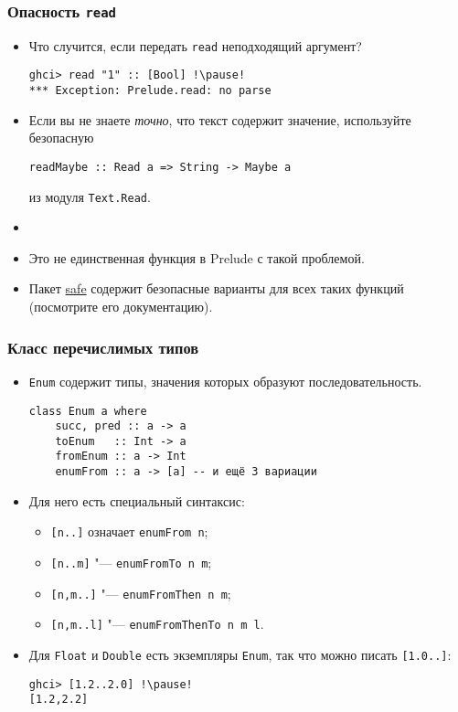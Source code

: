 \documentclass[10pt]{beamer}
\begin{document}
\begin{frame}[fragile]
\frametitle{Опасность \lstinline|read|}
\begin{itemize}
    \item Что случится, если передать \lstinline|read| неподходящий аргумент?
\begin{lstlisting}
ghci> read "1" :: [Bool] !\pause!
*** Exception: Prelude.read: no parse
\end{lstlisting}
    \item Если вы не знаете \emph{точно}, что текст содержит значение, используйте безопасную
\begin{lstlisting}
readMaybe :: Read a => String -> Maybe a
\end{lstlisting}
    из модуля \lstinline|Text.Read|.
    \pause
    \item[]
    \item Это не единственная функция в Prelude с такой проблемой.
    \item Пакет \href{https://hackage.haskell.org/package/safe}{safe} содержит безопасные варианты для всех таких функций (посмотрите его документацию).
    \end{itemize}
\end{frame}

\begin{frame}[fragile]
\frametitle{Класс перечислимых типов}
\begin{itemize}
    \item 
    \lstinline|Enum| содержит типы, значения которых образуют последовательность.
\begin{lstlisting}
class Enum a where
    succ, pred :: a -> a
    toEnum   :: Int -> a
    fromEnum :: a -> Int
    enumFrom :: a -> [a] -- и ещё 3 вариации
\end{lstlisting}
    \pause
    \item Для него есть специальный синтаксис: 
    \begin{itemize}
        \item \lstinline|[n..]| означает \lstinline|enumFrom n|;
        \item \lstinline|[n..m]| "--- \lstinline|enumFromTo n m|;
        \item \lstinline|[n,m..]| "--- \lstinline|enumFromThen n m|;
        \item \lstinline|[n,m..l]| "--- \lstinline|enumFromThenTo n m l|.
    \end{itemize}
    \pause
    \item Для \lstinline|Float| и \lstinline|Double| есть экземпляры \lstinline|Enum|, так что можно писать \lstinline|[1.0..]|: 
\begin{lstlisting}
ghci> [1.2..2.0] !\pause!
[1.2,2.2]
\end{lstlisting}
\end{itemize}
\end{frame}
\end{document}
